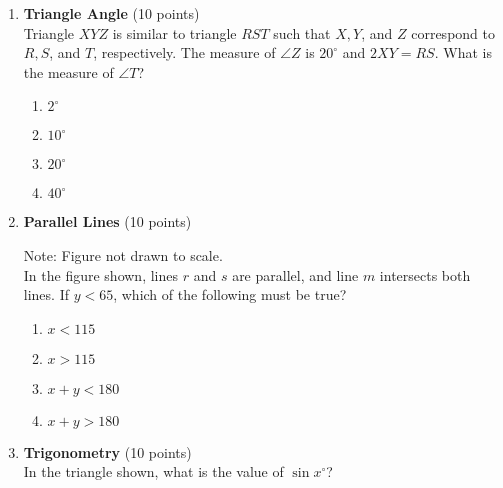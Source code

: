 \begin{enumerate}
  \item \textbf{Triangle Angle} (10 points)\\
  Triangle $X Y Z$ is similar to triangle $R S T$ such that $X, Y$, and $Z$ correspond to $R, S$, and $T$, respectively. The measure of $\angle Z$ is $20^{\circ}$ and $2 X Y=R S$. What is the measure of $\angle T$?\\
  \begin{enumerate}[label=(\Alph*)]
    \item $2^{\circ}$
    \item $10^{\circ}$
    \item $20^{\circ}$
    \item $40^{\circ}$
  \end{enumerate}
  \begin{subanswer}
  \end{subanswer}

  \newpage

  \item \textbf{Parallel Lines} (10 points)\\

  Note: Figure not drawn to scale.\\
  In the figure shown, lines $r$ and $s$ are parallel, and line $m$ intersects both lines. If $y<65$, which of the following must be true?\\
  \begin{enumerate}[label=(\Alph*)]
    \item $x<115$
    \item $x>115$
    \item $x+y<180$
    \item $x+y>180$
  \end{enumerate}
  \begin{subanswer}
  \end{subanswer}
  \newpage

  \item \textbf{Trigonometry} (10 points)\\
  In the triangle shown, what is the value of $\sin x^{\circ}$?
  \begin{subanswer}
  \end{subanswer}


\end{enumerate}
